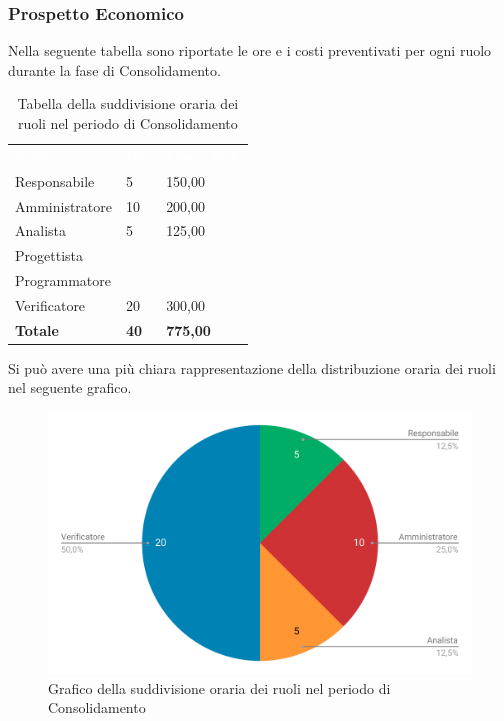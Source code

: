 \subsubsection{Prospetto Economico}
Nella seguente tabella sono riportate le ore e i costi preventivati per ogni ruolo durante la fase di Consolidamento.


\begin{table}[H]	
	\begin{center}
	    \begin{tabular}{C{4cm}C{1cm}C{3,5cm}}
			\textcolor{white}{\textbf{Ruolo}} & \textcolor{white}{\textbf{Ore}} & \textcolor{white}{\textbf{Costo in €}}
			\\
			Responsabile & 5 & 150,00 \\
			Amministratore & 10 & 200,00 \\
			Analista & 5 & 125,00 \\
			Progettista &  & \\
			Programmatore &  &  \\
			Verificatore & 20 & 300,00 \\
			\textbf{Totale} & \textbf{40} & \textbf{775,00} \\
		\end{tabular}
	    \caption{Tabella della suddivisione oraria dei ruoli nel periodo di Consolidamento} \label{tab:tabellaRuoliConsolidamento} 
	\end{center}
\end{table}


Si può avere una più chiara rappresentazione della distribuzione oraria dei ruoli nel seguente grafico.

\begin{figure}[H]
	\includegraphics[width=1\linewidth]{Preventivo/grafici/CO2.pdf}
	\caption{Grafico della suddivisione oraria dei ruoli nel periodo di Consolidamento}
\end{figure}

